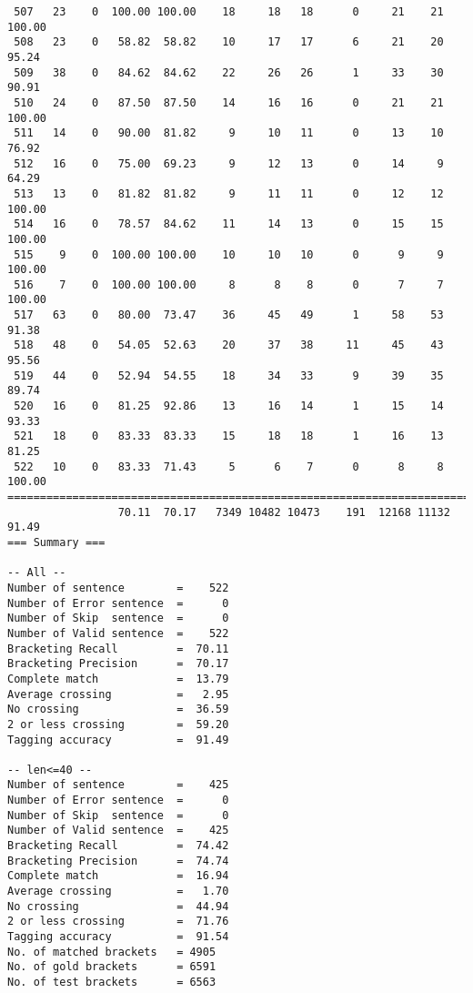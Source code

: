 \begin{verbatim}
 507   23    0  100.00 100.00    18     18   18      0     21    21   100.00
 508   23    0   58.82  58.82    10     17   17      6     21    20    95.24
 509   38    0   84.62  84.62    22     26   26      1     33    30    90.91
 510   24    0   87.50  87.50    14     16   16      0     21    21   100.00
 511   14    0   90.00  81.82     9     10   11      0     13    10    76.92
 512   16    0   75.00  69.23     9     12   13      0     14     9    64.29
 513   13    0   81.82  81.82     9     11   11      0     12    12   100.00
 514   16    0   78.57  84.62    11     14   13      0     15    15   100.00
 515    9    0  100.00 100.00    10     10   10      0      9     9   100.00
 516    7    0  100.00 100.00     8      8    8      0      7     7   100.00
 517   63    0   80.00  73.47    36     45   49      1     58    53    91.38
 518   48    0   54.05  52.63    20     37   38     11     45    43    95.56
 519   44    0   52.94  54.55    18     34   33      9     39    35    89.74
 520   16    0   81.25  92.86    13     16   14      1     15    14    93.33
 521   18    0   83.33  83.33    15     18   18      1     16    13    81.25
 522   10    0   83.33  71.43     5      6    7      0      8     8   100.00
============================================================================
                 70.11  70.17   7349 10482 10473    191  12168 11132    91.49
=== Summary ===

-- All --
Number of sentence        =    522
Number of Error sentence  =      0
Number of Skip  sentence  =      0
Number of Valid sentence  =    522
Bracketing Recall         =  70.11
Bracketing Precision      =  70.17
Complete match            =  13.79
Average crossing          =   2.95
No crossing               =  36.59
2 or less crossing        =  59.20
Tagging accuracy          =  91.49

-- len<=40 --
Number of sentence        =    425
Number of Error sentence  =      0
Number of Skip  sentence  =      0
Number of Valid sentence  =    425
Bracketing Recall         =  74.42
Bracketing Precision      =  74.74
Complete match            =  16.94
Average crossing          =   1.70
No crossing               =  44.94
2 or less crossing        =  71.76
Tagging accuracy          =  91.54
No. of matched brackets   = 4905
No. of gold brackets      = 6591
No. of test brackets      = 6563

\end{verbatim}

\normalsize

